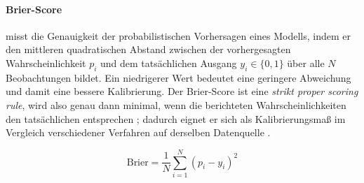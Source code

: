 \paragraph{Brier-Score} \parencite{brier1950verification} misst die Genauigkeit der probabilistischen Vorhersagen eines Modells, indem er den mittleren quadratischen Abstand zwischen der vorhergesagten Wahrscheinlichkeit $p_i$ und dem tatsächlichen Ausgang $y_i \in \{0,1\}$ über alle $N$ Beobachtungen bildet. Ein niedrigerer Wert bedeutet eine geringere Abweichung und damit eine bessere Kalibrierung. Der Brier-Score ist eine \emph{strikt proper scoring rule}, wird also genau dann minimal, wenn die berichteten Wahrscheinlichkeiten den tatsächlichen entsprechen \parencite{gneiting2007scoring}; dadurch eignet er sich als Kalibrierungsmaß im Vergleich verschiedener Verfahren auf derselben Datenquelle \parencite{niculescu2005predicting}.

\begin{equation}
  \text{Brier} = \frac{1}{N} \sum_{i=1}^{N} (p_i - y_i)^2
\end{equation}

